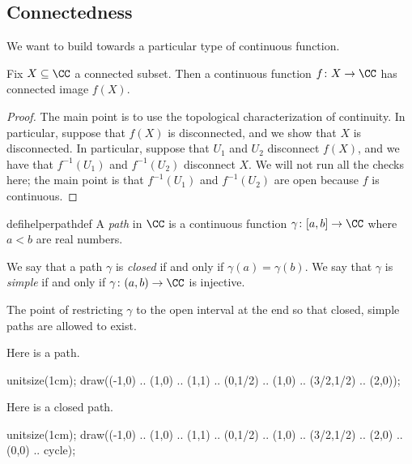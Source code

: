\documentclass[../notes.tex]{subfiles}
\begin{document}
\subsection{Connectedness}
We want to build towards a particular type of continuous function.
\begin{proposition} \label{prop:contconnectedimage}
	Fix $X\subseteq\CC$ a connected subset. Then a continuous function $f\colon X\to\CC$ has connected image $f(X)$.
\end{proposition}
\begin{proof}
	The main point is to use the topological characterization of continuity. In particular, suppose that $f(X)$ is disconnected, and we show that $X$ is disconnected. In particular, suppose that $U_1$ and $U_2$ disconnect $f(X)$, and we have that $f^{-1}(U_1)$ and $f^{-1}(U_2)$ disconnect $X$. We will not run all the checks here; the main point is that $f^{-1}(U_1)$ and $f^{-1}(U_2)$ are open because $f$ is continuous.
\end{proof}
\begin{restatable}[Path]{defihelper}{pathdef} 
	A \textit{path} in $\CC$ is a continuous function $\gamma\colon[a,b]\to\CC$ where $a<b$ are real numbers.
\end{restatable}
\begin{definition}
	We say that a path $\gamma$ is \textit{closed} if and only if $\gamma(a)=\gamma(b)$. We say that $\gamma$ is \textit{simple} if and only if $\gamma\colon(a,b)\to\CC$ is injective.
\end{definition}
\begin{remark}
	The point of restricting $\gamma$ to the open interval at the end so that closed, simple paths are allowed to exist.
\end{remark}
\begin{example}
	Here is a path.
	\begin{center}
		\begin{asy}
			unitsize(1cm);
			draw((-1,0) .. (1,0) .. (1,1) .. (0,1/2) .. (1,0) .. (3/2,1/2) .. (2,0));
		\end{asy}
	\end{center}
\end{example}
\begin{example}
	Here is a closed path.
	\begin{center}
		\begin{asy}
			unitsize(1cm);
			draw((-1,0) .. (1,0) .. (1,1) .. (0,1/2) .. (1,0) .. (3/2,1/2) .. (2,0) .. (0,0) .. cycle);
		\end{asy}
	\end{center}
\end{example}
\end{document}
